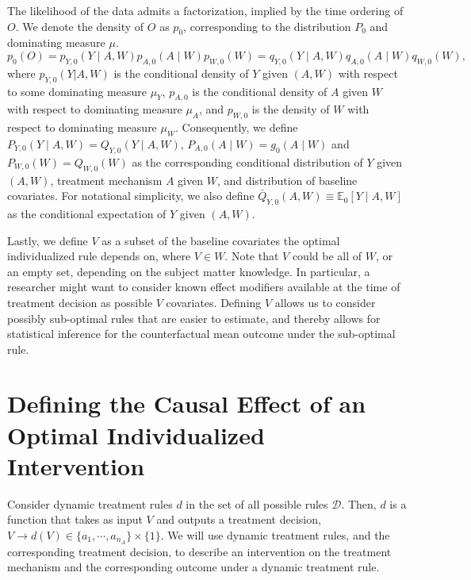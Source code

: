 \documentclass[12pt, krantz2,]{book}
\theoremstyle{definition}
\theoremstyle{definition}
\theoremstyle{definition}
\newcommand{\E}{\mathbb{E}}
\newcommand{\1}{\mathbbm{1}}
\begin{document}
The likelihood of the data admits a factorization, implied by the time ordering
of \(O\). We denote the density of \(O\) as \(p_0\), corresponding to the
distribution \(P_0\) and dominating measure \(\mu\).
\begin{equation}
  p_0(O) = p_{Y,0}(Y \mid A,W) p_{A,0}(A \mid W) p_{W,0}(W) =
    q_{Y,0}(Y \mid A,W) q_{A,0}(A \mid W) q_{W,0}(W),
  \label{eq:likelihood-factorization}
\end{equation}
where \(p_{Y,0}(Y|A,W)\) is the conditional density of \(Y\) given \((A, W)\) with
respect to some dominating measure \(\mu_Y\), \(p_{A,0}\) is the conditional density
of \(A\) given \(W\) with respect to dominating measure \(\mu_A\), and \(p_{W,0}\) is
the density of \(W\) with respect to dominating measure \(\mu_W\). Consequently, we
define \(P_{Y,0}(Y \mid A, W) = Q_{Y,0}(Y \mid A,W)\), \(P_{A,0}(A \mid W) = g_0(A \mid W)\) and \(P_{W,0}(W)=Q_{W,0}(W)\) as the corresponding conditional
distribution of \(Y\) given \((A,W)\), treatment mechanism \(A\) given \(W\), and
distribution of baseline covariates. For notational simplicity, we also define
\(\bar{Q}_{Y,0}(A,W) \equiv \E_0[Y \mid A,W]\) as the conditional expectation of
\(Y\) given \((A,W)\).

Lastly, we define \(V\) as a subset of the baseline covariates the optimal
individualized rule depends on, where \(V \in W\). Note that \(V\) could be all of
\(W\), or an empty set, depending on the subject matter knowledge. In particular,
a researcher might want to consider known effect modifiers available at the time
of treatment decision as possible \(V\) covariates. Defining \(V\) allows us to
consider possibly sub-optimal rules that are easier to estimate, and thereby
allows for statistical inference for the counterfactual mean outcome under the
sub-optimal rule.

\hypertarget{defining-the-causal-effect-of-an-optimal-individualized-intervention}{%
\section{Defining the Causal Effect of an Optimal Individualized Intervention}\label{defining-the-causal-effect-of-an-optimal-individualized-intervention}}

Consider dynamic treatment rules \(d\) in the set of all possible rules
\(\mathcal{D}\). Then, \(d\) is a function that takes as input \(V\) and outputs a
treatment decision, \(V \rightarrow d(V) \in \{a_1, \cdots, a_{n_A} \} \times \{1\}\). We will use dynamic treatment rules, and the corresponding treatment
decision, to describe an intervention on the treatment mechanism and the
corresponding outcome under a dynamic treatment rule.
\end{document}
